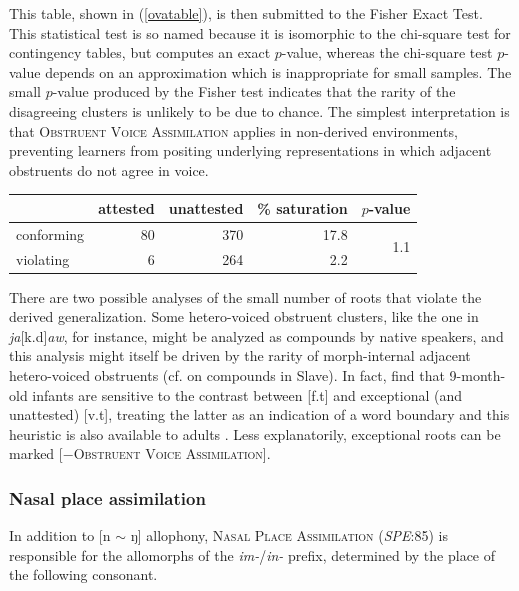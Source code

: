 This table, shown in (\ref{ovatable}), is then submitted to the Fisher Exact Test. This statistical test is so named because it is isomorphic to the chi-square test 
for contingency tables, but computes an exact $p$-value, whereas the chi-square test $p$-value depends on an approximation which is inappropriate for small samples. The small $p$-value produced by the Fisher test indicates that the rarity of the disagreeing clusters is unlikely to be due to chance. The simplest interpretation is that \textsc{Obstruent Voice Assimilation} applies in non-derived environments, preventing learners from positing underlying representations in which adjacent obstruents do not agree in voice.

\begin{example} \label{ovatable}
\begin{tabular}{l r r r r}
\toprule
           & attested & unattested & \% saturation & $p$-value                   \\
\midrule
conforming & 80       & 370        & 17.8          & \multirow{2}{*}{1.1\e{-11}} \\
violating  &  6       & 264        & 2.2           \\
\bottomrule
\end{tabular}
\end{example}

There are two possible analyses of the small number of roots that violate the derived generalization. Some hetero-voiced obstruent clusters, like the one in \emph{ja}[k.d]\emph{aw}, for instance, might be analyzed as compounds by native speakers, and this analysis might itself be driven by the rarity of morph-internal adjacent hetero-voiced obstruents (cf. \citealp[546]{Rice2009d} on compounds in Slave). In fact, \citet{Mattys2001b} find that 9-month-old infants are sensitive to the contrast between [f.t] and exceptional (and unattested) [v.t], treating the latter as an indication of a word boundary and this heuristic is also available to adults \citep{Brown1956,McQueen1998}. Less explanatorily, exceptional roots can be marked [$-$\textsc{Obstruent Voice Assimilation}].

\subsubsection{Nasal place assimilation} \label{npa}

In addition to [n $\sim$ ŋ] allophony, \textsc{Nasal Place Assimilation} (\emph{SPE}:85) is responsible for the allomorphs of the \emph{im-}/\emph{in-} prefix, determined by the place of the following consonant.

